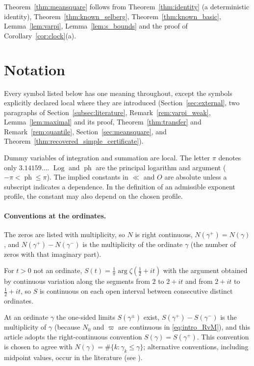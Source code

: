 \documentclass[11pt,a4paper]{article}
\makeatletter
\numberwithin{equation}{section}
\DeclareRobustCommand{\CGref}[1]{\ref{#1}}
\DeclareRobustCommand{\CGeqref}[1]{\eqref{#1}}
\DeclareRobustCommand{\CGcite}[2][]{\if\relax\detokenize{#1}\relax\cite{#2}\else\cite[#1]{#2}\fi}
\let\CG@origref\ref
\let\CG@origeqref\eqref
\newcommand{\CG@gettip}[1]{\@ifundefined{CGTip@#1}{#1}{\csname CGTip@#1\endcsname}}
\newcommand{\CG@getbib}[1]{\@ifundefined{CGBib@#1}{#1}{\csname CGBib@#1\endcsname}}
\DeclareRobustCommand{\CGref}[1]{\pdftooltip{\CG@origref{#1}}{\CG@gettip{#1}}}
\DeclareRobustCommand{\CGeqref}[1]{\pdftooltip{\CG@origeqref{#1}}{\CG@gettip{#1}}}
\DeclareRobustCommand{\CGcite}[2][]{\pdftooltip{\if\relax\detokenize{#1}\relax\cite{#2}\else\cite[#1]{#2}\fi}{\CG@getbib{#2}}}
\theoremstyle{definition}
\theoremstyle{remark}
\newcommand{\Nz}{N_0} %
\makeatother
\begin{document}
Theorem~\CGref{thm:meansquare} follows from Theorem~\CGref{thm:identity} (a deterministic identity), Theorem~\CGref{thm:known_selberg}, Theorem~\CGref{thm:known_basic}, Lemma~\CGref{lem:varpi}, Lemma~\CGref{lem:s_bounds} and the proof of Corollary~\CGref{cor:clock}(a).

\section{Notation}\label{sec:notation}

Every symbol listed below has one meaning throughout, except the symbols explicitly declared local where they are introduced (Section~\CGref{sec:external}, two paragraphs of Section~\CGref{subsec:literature}, Remark~\CGref{rem:varpi_weak}, Lemma~\CGref{lem:maximal} and its proof, Theorem~\CGref{thm:transfer} and Remark~\CGref{rem:quantile}, Section~\CGref{sec:meansquare}, and Theorem~\CGref{thm:recovered_simple_certificate}).

Dummy variables of integration and summation are local. The letter $\pi$ denotes only $3.14159\ldots$. $\operatorname{Log}$ and $\operatorname{ph}$ are the principal logarithm and argument ($-\pi<\operatorname{ph}\le\pi$). The implied constants in $\ll$ and $O$ are absolute unless a subscript indicates a dependence. In the definition of an admissible exponent profile, the constant may also depend on the chosen profile.

\paragraph{Conventions at the ordinates.}
The zeros are listed with multiplicity, so $N$ is right continuous, $N(\gamma^+)=N(\gamma)$, and $N(\gamma^+)-N(\gamma^-)$ is the multiplicity of the ordinate $\gamma$ (the number of zeros with that imaginary part).

For $t>0$ not an ordinate, $S(t)=\frac1\pi\arg\zeta(\frac12+it)$ with the argument obtained by continuous variation along the segments from $2$ to $2+it$ and from $2+it$ to $\frac12+it$, so $S$ is continuous on each open interval between consecutive distinct ordinates.

At an ordinate $\gamma$ the one-sided limits $S(\gamma^\pm)$ exist, $S(\gamma^+)-S(\gamma^-)$ is the multiplicity of $\gamma$ (because $\Nz$ and $\varpi$ are continuous in \CGeqref{eq:intro_RvM}), and this article adopts the right-continuous convention $S(\gamma)=S(\gamma^+)$. This convention is chosen to agree with $N(\gamma)=\#\{k:\gamma_k\le\gamma\}$; alternative conventions, including midpoint values, occur in the literature (see \CGcite[\S9.3]{Titchmarsh1986}).
\end{document}
